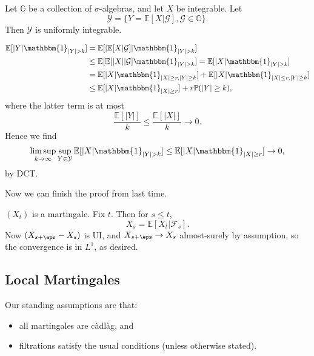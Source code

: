 \documentclass[12pt]{article}
\begin{document}
\begin{proposition}
	Let $\mathbb{G}$ be a collection of $\sigma$-algebras, and let $X$ be integrable. Let
	\[
		\mathcal{Y} = \{ Y = \mathbb{E}[X | \mathcal{G}], \mathcal{G} \in \mathbb{G}\}.
	\]
	Then $\mathcal{Y}$ is uniformly integrable.
\end{proposition}

\begin{proofbox}
	\begin{align*}
		\mathbb{E}[|Y| \mathbbm{1}_{|Y| > k}] &= \mathbb{E}[|\mathbb{E}[X|\mathcal{G}]| \mathbbm{1}_{|Y| > k}] \\
						      &\leq \mathbb{E}[\mathbb{E}[|X|| \mathcal{G}]\mathbbm{1}_{|Y| \geq k}] = \mathbb{E}[|X| \mathbbm{1}_{|Y| \geq k}] \\
						      &= \mathbb{E}[|X| \mathbbm{1}_{|X| \geq r, |Y| \geq k}] + \mathbb{E}[|X| \mathbbm{1}_{|X| \leq r, |Y| \geq k}] \\
						      &\leq \mathbb{E}[|X| \mathbbm{1}_{|X| \geq r}] + r \mathbb{P}(|Y| \geq k),
	\end{align*}
	where the latter term is at most
	\[
	\frac{\mathbb{E}[|Y|]}{k} \leq \frac{\mathbb{E}[|X|]}{k} \to 0.
	\]
	Hence we find
	\[
		\limsup_{k \to \infty} \sup_{Y \in \mathcal{Y}} \mathbb{E}[|X| \mathbbm{1}_{|Y| > k}] \leq \mathbb{E}[|X| \mathbbm{1}_{|X| \geq r}] \to 0,
	\]
	by DCT.
\end{proofbox}

Now we can finish the proof from last time.

\begin{proofbox}
	$(X_t)$ is a martingale. Fix $t$. Then for $s \leq t$,
	\[
	X_s = \mathbb{E}[X_t | \mathcal{F}_s].
	\]
	Now $(X_{s + \eps} - X_s)$ is UI, and $X_{s + \eps} \to X_s$ almost-surely by assumption, so the convergence is in $L^1$, as desired.
\end{proofbox}

\subsection{Local Martingales}%
\label{sub:lm}

\begin{remark}
	Our standing assumptions are that:
	\begin{itemize}
		\item all martingales are c\`adl\`ag, and
		\item filtrations satisfy the usual conditions (unless otherwise stated).
	\end{itemize}
\end{remark}
\end{document}
